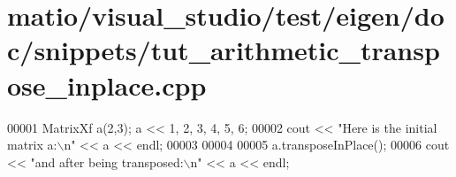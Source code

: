 \hypertarget{matio_2visual__studio_2test_2eigen_2doc_2snippets_2tut__arithmetic__transpose__inplace_8cpp_source}{}\section{matio/visual\+\_\+studio/test/eigen/doc/snippets/tut\+\_\+arithmetic\+\_\+transpose\+\_\+inplace.cpp}
\label{matio_2visual__studio_2test_2eigen_2doc_2snippets_2tut__arithmetic__transpose__inplace_8cpp_source}

\begin{DoxyCode}
00001 MatrixXf a(2,3); a << 1, 2, 3, 4, 5, 6;
00002 cout << \textcolor{stringliteral}{"Here is the initial matrix a:\(\backslash\)n"} << a << endl;
00003 
00004 
00005 a.transposeInPlace();
00006 cout << \textcolor{stringliteral}{"and after being transposed:\(\backslash\)n"} << a << endl;
\end{DoxyCode}
